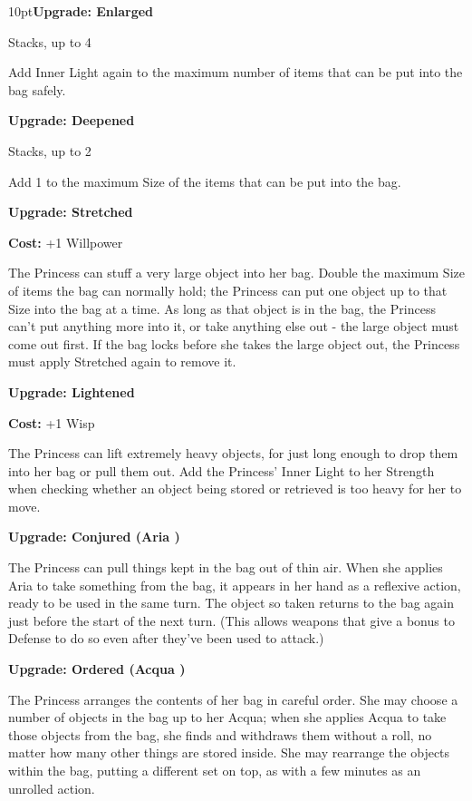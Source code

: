 \begin{myindentpar}{10pt}\textbf{Upgrade: Enlarged}

Stacks, up to 4

Add Inner Light again to the maximum number of items that can be put into the bag safely.

\textbf{Upgrade: Deepened}

Stacks, up to 2

Add 1 to the maximum Size of the items that can be put into the bag.

\textbf{Upgrade: Stretched}

\noindent \textbf{Cost:} +1 Willpower

The Princess can stuff a very large object into her bag. Double the maximum Size of items the bag can normally hold; the Princess can put one object up to that Size into the bag at a time. As long as that object is in the bag, the Princess can't put anything more into it, or take anything else out - the large object must come out first. If the bag locks before she takes the large object out, the Princess must apply Stretched again to remove it.

\textbf{Upgrade: Lightened}

\noindent \textbf{Cost:} +1 Wisp

The Princess can lift extremely heavy objects, for just long enough to drop them into her bag or pull them out. Add the Princess' Inner Light to her Strength when checking whether an object being stored or retrieved is too heavy for her to move.

\textbf{Upgrade: Conjured (Aria \textbullet\textbullet)}

The Princess can pull things kept in the bag out of thin air. When she applies Aria to take something from the bag, it appears in her hand as a reflexive action, ready to be used in the same turn. The object so taken returns to the bag again just before the start of the next turn. (This allows weapons that give a bonus to Defense to do so even after they've been used to attack.)

\textbf{Upgrade: Ordered (Acqua \textbullet\textbullet)}

The Princess arranges the contents of her bag in careful order. She may choose a number of objects in the bag up to her Acqua; when she applies Acqua to take those objects from the bag, she finds and withdraws them without a roll, no matter how many other things are stored inside. She may rearrange the objects within the bag, putting a different set on top, as with a few minutes as an unrolled action.\end{myindentpar}

